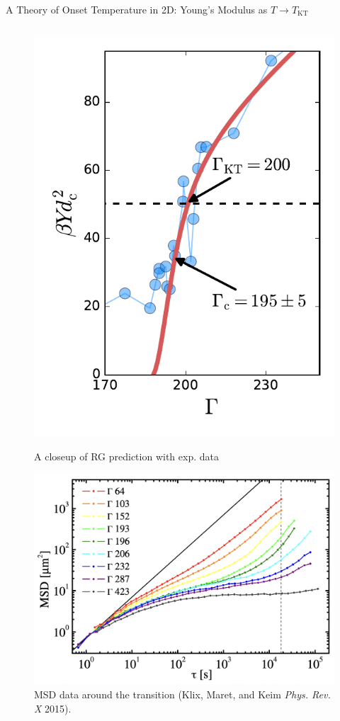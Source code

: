 \begin{frame}{A Theory of Onset Temperature in 2D: Young's Modulus as $T \to T_\mathrm{KT}$}
\begin{columns}
\begin{column}[T]{0.425\textwidth}
\begin{figure}
\begin{overprint}
\centering\includegraphics[height=0.75\textheight]{c.13-kt_keim_1/YRG_keim_closeup.pdf}\caption{A closeup of RG prediction with exp. data}

\vspace{20pt}\centering\includegraphics[width=\linewidth]{c.13-kt_keim_1/msd_keim.png}\caption{MSD data around the transition  (Klix, Maret, and Keim \textit{Phys. Rev. X} 2015).}


\end{overprint}
\end{figure}
\end{column}
\end{columns}
\end{frame}
